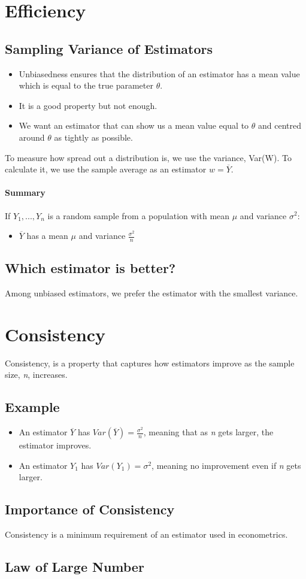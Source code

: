 \documentclass[11pt,a4paper]{report}
\begin{document}
\section{Efficiency}
\subsection{Sampling Variance of Estimators}
\begin{itemize}
    \item Unbiasedness ensures that the distribution of an estimator has a mean value which is equal to the true parameter $\theta$.
    \item It is a good property but not enough.
    \item We want an estimator that can show us a mean value equal to $\theta$ and centred around $\theta$ as tightly as possible.
\end{itemize}
To measure how spread out a distribution is, we use the variance, Var(W). To calculate it, we use the sample average as an estimator $w = \overline{Y}$.
\paragraph{Summary}
If ${Y_1, ..., Y_n}$ is a random sample from a population with mean $\mu$ and variance $\sigma^2$:
\begin{itemize}
    \item $\overline{Y}$ has a mean $\mu$ and variance $\frac{\sigma^2}{n}$
\end{itemize}
\subsection{Which estimator is better?}
Among unbiased estimators, we prefer the estimator with the smallest variance.

\section{Consistency}
Consistency, is a property that captures how estimators improve as the sample size, \textit{n}, increases.
\subsection{Example}
\begin{itemize}
    \item An estimator $\overline{Y}$ has $Var(\overline{Y}) = \frac{\sigma^2}{n}$, meaning that as \textit{n} gets larger, the estimator improves.
    \item An estimator $Y_1$ has $Var(Y_1) = \sigma^2$, meaning no improvement even if \textit{n} gets larger.
\end{itemize}
\subsection{Importance of Consistency}
Consistency is a minimum requirement of an estimator used in econometrics.
\subsection{Law of Large Number}
\end{document}
